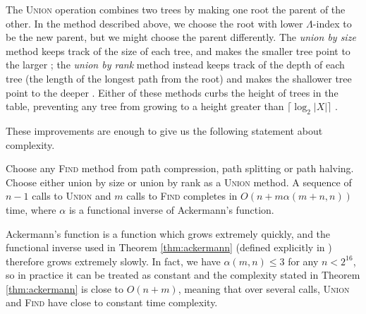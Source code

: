 The \textsc{Union} operation combines two trees by making one root the parent of
the other.  In the method described above, we choose the root with lower $\Lambda$-index
to be the new parent, but we might choose the parent differently.  The
\textit{union by size} method keeps track of the size of each tree, and makes
the smaller tree point to the larger \cite{galil_1991}; the \textit{union by
  rank} method instead keeps track of the depth of each tree (the length of the
longest path from the root) and makes the shallower tree point to the deeper
\cite{tarjan_1984}.  Either of these methods curbs the height of trees in the
table, preventing any tree from growing to a height greater than
$\lceil\log_2 |X|\rceil$ \cite[Lemma 1.1.2]{galil_1991}.

These improvements are enough to give us the following statement about
complexity.

\begin{theorem}
  \label{thm:ackermann}
  Choose any \textsc{Find} method from path compression, path splitting or path
  halving.  Choose either union by size or union by rank as a \textsc{Union}
  method.  A sequence of $n-1$ calls to \textsc{Union} and $m$ calls to
  \textsc{Find} completes in $O(n + m\alpha(m+n, n))$ time, where $\alpha$ is
  a functional inverse of Ackermann's function.
\end{theorem}

Ackermann's function is a function which grows extremely quickly, and the
functional inverse used in Theorem \ref{thm:ackermann} (defined explicitly in
\cite{tarjan_1984}) therefore grows extremely slowly.  In fact, we have
$\alpha(m,n) \leq 3$ for any $n < 2^{16}$, so in practice it can be treated as
constant and the complexity stated in Theorem \ref{thm:ackermann} is close to
$O(n + m)$, meaning that over several calls, \textsc{Union} and \textsc{Find}
have close to constant time complexity.

